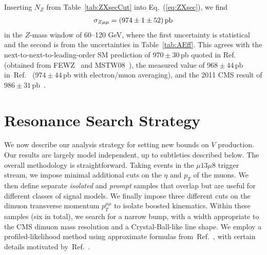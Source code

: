 \documentclass[aps,prd,twocolumn,superscriptaddress,preprintnumbers,nofootinbib,longbibliography,floatfix]{revtex4-1}
\newcommand{\ptmm}{p_T^{\mu\mu}}
\DeclareRobustCommand{\Tab}[1]{Table~\ref{#1}}
\DeclareRobustCommand{\Eq}[1]{Eq.~(\ref{#1})}
\DeclareRobustCommand{\Ref}[1]{Ref.~\cite{#1}}
\begin{document}
Inserting $N_Z$ from \Tab{tab:ZXsecCut} into \Eq{eq:ZXsec}, we find 
%
\begin{align}
\sigma_{Z\mu\mu}  = ( 974\pm1\pm52)\,{\rm pb}
\end{align}
%
in the $Z$-mass window of 60--120 GeV, where the first uncertainty is statistical and the second is from the uncertainties in \Tab{tab:AEff}.
%
This agrees with
the next-to-next-to-leading-order SM prediction of $970\pm 30\,$pb quoted in \Ref{CMS:2011aa} (obtained from FEWZ~\cite{Gavin:2010az} and MSTW08~\cite{Martin:2009iq}), 
the measured value of $968\pm44\,$pb in~\Ref{CMS:2011aa} ($974\pm44\,$pb with electron/muon averaging),
and the 2011 CMS result of $986\pm31$\,pb~\cite{Chatrchyan:2013tia}.



\section{Resonance Search Strategy}
\label{sec:Strategy}

We now describe our analysis strategy for setting new bounds on $V$ production.
%
Our results are largely model independent, up to subtleties described below.
%
The overall methodology is straightforward.
%
Taking events in the $\mu13\mu8$ trigger stream, we impose minimal additional cuts on the $\eta$ and $p_T$ of the muons.
%
We then define separate {\it isolated} and {\it prompt} samples that overlap but are useful for different classes of signal models.
%
We finally impose three different cuts on the dimuon transverse momentum $\ptmm$ to isolate boosted kinematics.
%
Within these samples (six in total), we search for a narrow bump, with a width appropriate to the CMS dimuon mass resolution and a Crystal-Ball-like line shape.
%
We employ a profiled-likelihood method using approximate formulas from~\Ref{Cowan:2010js}, with certain details motivated by~\Ref{Williams:2017gwf}.
\end{document}
